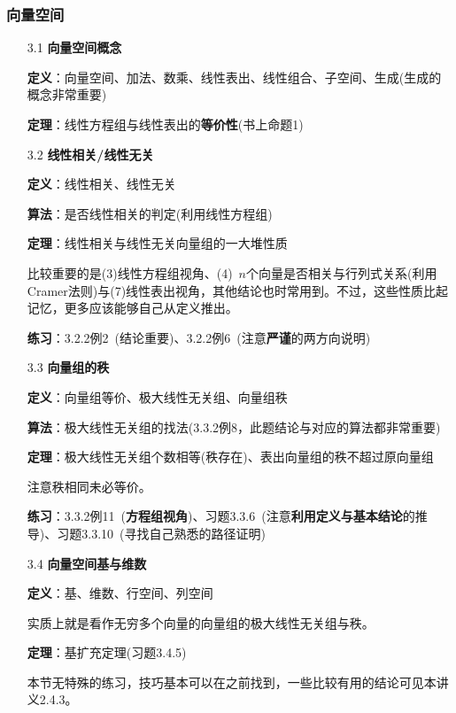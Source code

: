 \documentclass[a4paper,UTF8,fontset=windows]{ctexart}
\newcommand*{\note}{\noindent *}
\begin{document}
\subsubsection{向量空间}
\begin{enumerate}
    \item[3.1] \textbf{向量空间概念}
    
    \textbf{定义}：向量空间、加法、数乘、线性表出、线性组合、子空间、生成(生成的概念非常重要)

    \textbf{定理}：线性方程组与线性表出的\textbf{等价性}(书上命题1)

    \item[3.2] \textbf{线性相关/线性无关}
    
    \textbf{定义}：线性相关、线性无关

    \textbf{算法}：是否线性相关的判定(利用线性方程组)

    \textbf{定理}：线性相关与线性无关向量组的一大堆性质
    
    \note 比较重要的是(3)线性方程组视角、(4)\ $n$个向量是否相关与行列式关系(利用Cramer法则)与(7)线性表出视角，其他结论也时常用到。不过，这些性质比起记忆，更多应该能够自己从定义推出。

    \textbf{练习}：3.2.2例2\ (结论重要)、3.2.2例6\ (注意\textbf{严谨}的两方向说明)

    \item[3.3] \textbf{向量组的秩}
    
    \textbf{定义}：向量组等价、极大线性无关组、向量组秩

    \textbf{算法}：极大线性无关组的找法(3.3.2例8，此题结论与对应的算法都非常重要)

    \textbf{定理}：极大线性无关组个数相等(秩存在)、表出向量组的秩不超过原向量组

    \note 注意秩相同未必等价。

    \textbf{练习}：3.3.2例11\ (\textbf{方程组视角})、习题3.3.6\ (注意\textbf{利用定义与基本结论}的推导)、习题3.3.10\ (寻找自己熟悉的路径证明)

    \item[3.4] \textbf{向量空间基与维数}
    
    \textbf{定义}：基、维数、行空间、列空间

    \note 实质上就是看作无穷多个向量的向量组的极大线性无关组与秩。

    \textbf{定理}：基扩充定理(习题3.4.5)

    \note 本节无特殊的练习，技巧基本可以在之前找到，一些比较有用的结论可见本讲义2.4.3。


\end{enumerate}
\end{document}
